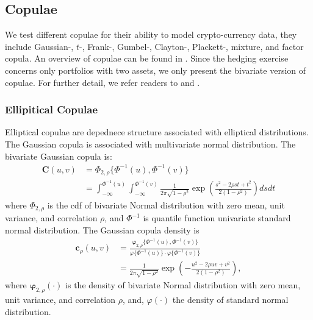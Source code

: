 
\subsection{Copulae}\label{subsec:copulae}
We test different copulae for their ability to model crypto-currency data,
they include Gaussian-, $t$-, Frank-, Gumbel-, Clayton-, Plackett-, mixture, and factor copula.
An overview of copulae can be found in \citet{hardle2010copulis}.
Since the hedging exercise concerns only portfolios with two assets, we only present the bivariate version of copulae.
For further detail, we refer readers to \citet{joe1997multivariate} and \citet{Nelsen1999}.
%
%

\subsubsection{Ellipitical Copulae}\label{sec:ellpitical-copulae}
Elliptical copulae are depednece structure associated with elliptical distributions.
The Gaussian copula is associated with multivariate normal distribution.
The bivariate Gaussian copula is:
    \begin{align}
        \bm{C}(u,v) &= \Phi_{2, \rho}\{\Phi^{-1}(u), \Phi^{-1}(v)\} \nonumber \\
                    &= \int_{-\infty}^{\Phi^{-1}(u)}
                       \int_{-\infty}^{\Phi^{-1}(v)}
                       \frac{1}{2\pi\sqrt{1-\rho^2}}
                       \exp{\left(
                       \frac{s^2-2\rho st+t^2}{2(1-\rho^2)}
                       \right)} ds dt
        \end{align}
where $\Phi_{2, \rho}$ is the cdf of bivariate Normal distribution with zero mean, unit variance, and correlation $\rho$,
and $\Phi^{-1}$ is quantile function univariate standard normal distribution.
The Gaussian copula density is
\begin{align}
    \bm{c}_\rho(u,v) &= \frac{\bm{\varphi}_{2,\rho}\{\Phi^{-1}(u), \Phi^{-1}(v)\}}
                        {\varphi\{\Phi^{-1}(u)\} \cdot \varphi\{\Phi^{-1}(v)\}} \nonumber \\
                &= \frac{1}{2\pi\sqrt{1-\rho^2}}\exp\left(
                   -\frac{u^2 - 2\rho uv + v^2}{2(1-\rho^2)}
                   \right),
    \end{align}
where $\bm{\varphi}_{2,\rho}(\cdot)$ is the density of bivariate Normal distribution with zero mean,
unit variance,
and correlation $\rho$,
and, $\varphi(\cdot)$ the density of standard normal distribution.\medskip

